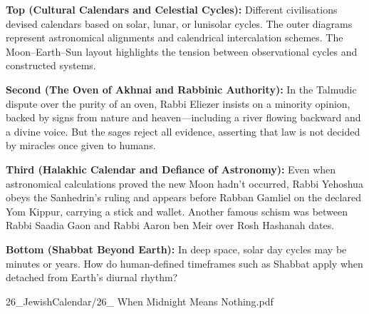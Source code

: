 \begin{SideNotePage}{

    \textbf{Top (Cultural Calendars and Celestial Cycles):}  
    Different civilisations devised calendars based on solar, lunar, or lunisolar cycles. The outer diagrams represent astronomical alignments and calendrical intercalation schemes. The Moon–Earth–Sun layout highlights the tension between observational cycles and constructed systems. \par
  
    \textbf{Second (The Oven of Akhnai and Rabbinic Authority):}  
    In the Talmudic dispute over the purity of an oven, Rabbi Eliezer insists on a minority opinion, backed by signs from nature and heaven—including a river flowing backward and a divine voice. But the sages reject all evidence, asserting that law is not decided by miracles once given to humans. \par
  
    \textbf{Third (Halakhic Calendar and Defiance of Astronomy):}  
    Even when astronomical calculations proved the new Moon hadn’t occurred, Rabbi Yehoshua obeys the Sanhedrin’s ruling and appears before Rabban Gamliel on the declared Yom Kippur, carrying a stick and wallet. Another famous schism was between Rabbi Saadia Gaon and Rabbi Aaron ben Meir over Rosh Hashanah dates. \par
  
    \textbf{Bottom (Shabbat Beyond Earth):}  
    In deep space, solar day cycles may be minutes or years. How do human-defined timeframes such as Shabbat apply when detached from Earth's diurnal rhythm? \par
  
}{26_JewishCalendar/26_ When Midnight Means Nothing.pdf}
\end{SideNotePage}
